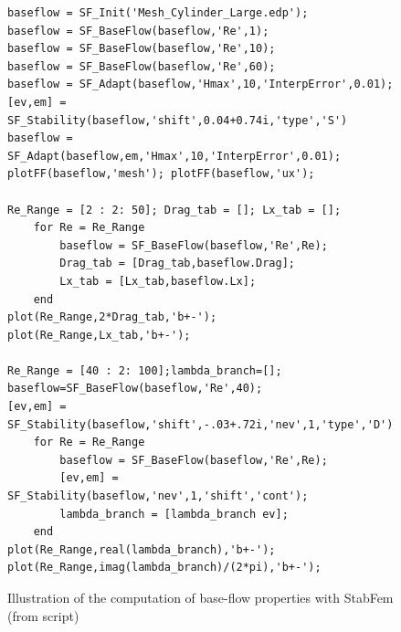 \documentclass[twocolumn,10pt]{asme2ej}
\begin{document}
\begin{figure}[t]
\small
\begin{lstlisting}
baseflow = SF_Init('Mesh_Cylinder_Large.edp');
baseflow = SF_BaseFlow(baseflow,'Re',1);
baseflow = SF_BaseFlow(baseflow,'Re',10);
baseflow = SF_BaseFlow(baseflow,'Re',60);
baseflow = SF_Adapt(baseflow,'Hmax',10,'InterpError',0.01);
[ev,em] = SF_Stability(baseflow,'shift',0.04+0.74i,'type','S')
baseflow = SF_Adapt(baseflow,em,'Hmax',10,'InterpError',0.01);
plotFF(baseflow,'mesh'); plotFF(baseflow,'ux');

Re_Range = [2 : 2: 50]; Drag_tab = []; Lx_tab = [];
    for Re = Re_Range
        baseflow = SF_BaseFlow(baseflow,'Re',Re);
        Drag_tab = [Drag_tab,baseflow.Drag];
        Lx_tab = [Lx_tab,baseflow.Lx];
    end
plot(Re_Range,2*Drag_tab,'b+-');
plot(Re_Range,Lx_tab,'b+-');

Re_Range = [40 : 2: 100];lambda_branch=[];
baseflow=SF_BaseFlow(baseflow,'Re',40);
[ev,em] = SF_Stability(baseflow,'shift',-.03+.72i,'nev',1,'type','D');
    for Re = Re_Range
        baseflow = SF_BaseFlow(baseflow,'Re',Re);
        [ev,em] = SF_Stability(baseflow,'nev',1,'shift','cont');
        lambda_branch = [lambda_branch ev];
    end
plot(Re_Range,real(lambda_branch),'b+-');
plot(Re_Range,imag(lambda_branch)/(2*pi),'b+-');
\end{lstlisting}
\normalsize
\caption{Illustration of the computation of base-flow properties with StabFem (from script)}
\label{Listing2}
\end{figure}
\end{document}
